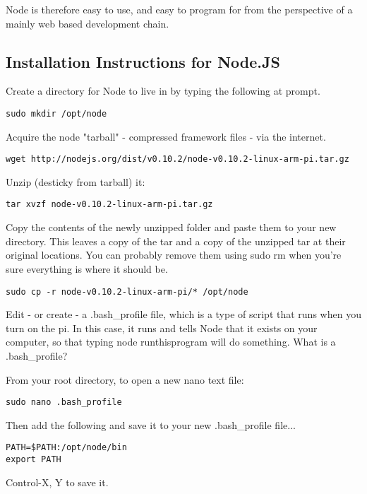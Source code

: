 Node is therefore easy to use, and easy to program for from the perspective of a mainly web based development chain. 

\subsection{Installation Instructions for Node.JS}
Create a directory for Node to live in by typing the following at prompt.
\begin{lstlisting}
sudo mkdir /opt/node
\end{lstlisting}

Acquire the node "tarball" - compressed framework files - via the internet.

\begin{lstlisting}
wget http://nodejs.org/dist/v0.10.2/node-v0.10.2-linux-arm-pi.tar.gz
\end{lstlisting}

Unzip (desticky from tarball) it:
\begin{lstlisting}
tar xvzf node-v0.10.2-linux-arm-pi.tar.gz
\end{lstlisting}

Copy the contents of the newly unzipped folder and paste them to your new directory. This leaves a copy of the tar and a copy of the unzipped tar at their original locations. You can probably remove them using sudo rm when you're sure everything is where it should be.

\begin{lstlisting}
sudo cp -r node-v0.10.2-linux-arm-pi/* /opt/node
\end{lstlisting}

Edit - or create - a .bash_profile file, which is a type of script that runs when you turn on the pi. In this case, it runs and tells Node that it exists on your computer, so that typing node runthisprogram will do something. What is a .bash_profile?

From your root directory, to open a new nano text file:
\begin{lstlisting}
sudo nano .bash_profile 
\end{lstlisting}

Then add the following and save it to your new .bash_profile file...

\begin{lstlisting}
PATH=$PATH:/opt/node/bin 
export PATH
\end{lstlisting}

Control-X, Y to save it.

